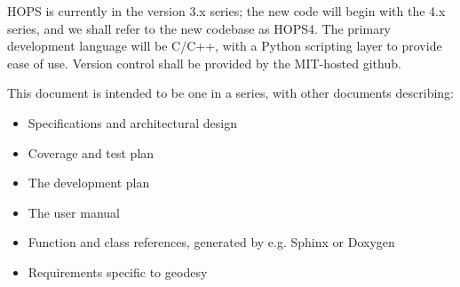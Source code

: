 \acs{HOPS} is currently in the version 3.x series; the new code will
begin with the 4.x series, and we shall refer to the new codebase as HOPS4.
The primary development language will be C/C++, with a Python scripting layer
to provide ease of use. Version control shall be provided by the MIT-hosted
github. 









This document is intended to be one in a series, with other documents
describing:
\begin{itemize}
\item Specifications and architectural design
\item Coverage and test plan
\item The development plan
\item The user manual
\item Function and class references, generated by e.g. Sphinx or Doxygen
\item Requirements specific to geodesy
\end{itemize}





%
%
